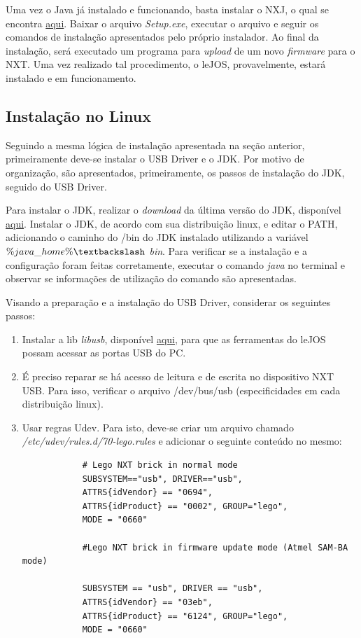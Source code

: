 	Uma vez o Java já instalado e funcionando, basta instalar o NXJ, o qual se encontra \href{http://www.lejos.org/}{aqui}. Baixar o arquivo \textit{Setup.exe}, executar o arquivo e seguir os comandos de instalação apresentados pelo próprio instalador. Ao final da instalação, será executado um programa para \textit{upload} de um novo \textit{firmware} para o NXT.
	Uma vez realizado tal procedimento, o leJOS, provavelmente, estará instalado e em funcionamento.

\subsection{Instalação no Linux} %
\label{sub:instalação_no_linux}

	Seguindo a mesma lógica de instalação apresentada na seção anterior, primeiramente deve-se instalar o USB Driver e o JDK. Por motivo de organização, são apresentados, primeiramente, os passos de instalação do JDK, seguido do USB Driver.

	Para instalar o JDK, realizar o \textit{download} da última versão do JDK, disponível \href{http://www.oracle.com/technetwork/java/}{aqui}.
	Instalar o JDK, de acordo com sua distribuição linux, e editar o PATH, adicionando o caminho do /bin do JDK instalado utilizando a
	variável \textit{$\%java\_home\% \textbackslash$ bin}. Para verificar se a instalação e a configuração foram feitas corretamente,
	executar o comando \textit{java} no terminal e observar se informações de utilização do comando são apresentadas.

	Visando a preparação e a instalação do USB Driver, considerar os seguintes passos:

	\begin{enumerate}
		\item Instalar a lib \textit{libusb}, disponível \href{http://libusb.sourceforge.net}{aqui}, para que as ferramentas do leJOS possam acessar as portas USB do PC.
		\item É preciso reparar se há acesso de leitura e de escrita no dispositivo NXT USB. Para isso, verificar o arquivo /dev/bus/usb (especificidades em cada distribuição linux).
		\item Usar regras Udev. Para isto, deve-se criar um arquivo chamado \textit{/etc/udev/rules.d/70-lego.rules} e adicionar o seguinte conteúdo no mesmo:

		\begin{lstlisting}
			# Lego NXT brick in normal mode
			SUBSYSTEM=="usb", DRIVER=="usb",
			ATTRS{idVendor} == "0694",
			ATTRS{idProduct} == "0002", GROUP="lego",
			MODE = "0660"

			#Lego NXT brick in firmware update mode (Atmel SAM-BA mode)

			SUBSYSTEM == "usb", DRIVER == "usb",
			ATTRS{idVendor} == "03eb",
			ATTRS{idProduct} == "6124", GROUP="lego",
			MODE = "0660"
		\end{lstlisting}
	\end{enumerate}

